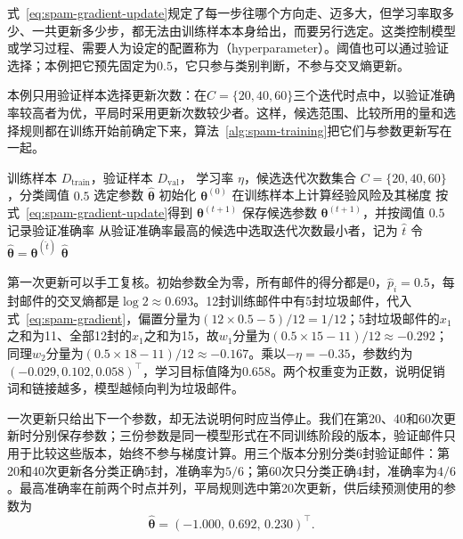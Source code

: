 式~\eqref{eq:spam-gradient-update}规定了每一步往哪个方向走、迈多大，但学习率取多少、一共更新多少步，都无法由训练样本本身给出，而要另行选定。这类控制模型或学习过程、需要人为设定的配置称为（hyperparameter）。阈值也可以通过验证选择；本例把它预先固定为$0.5$，它只参与类别判断，不参与交叉熵更新。

本例只用验证样本选择更新次数：在$C=\{20,40,60\}$三个迭代时点中，以验证准确率较高者为优，平局时采用更新次数较少者。这样，候选范围、比较所用的量和选择规则都在训练开始前确定下来，算法~\ref{alg:spam-training}把它们与参数更新写在一起。

\begin{algorithm}[垃圾邮件分类器的训练]
  \label{alg:spam-training}
  \begin{algorithmic}[1]
    \Require 训练样本 $D_{\mathrm{train}}$，验证样本 $D_{\mathrm{val}}$，
      学习率 $\eta$，候选迭代次数集合 $C=\{20,40,60\}$，分类阈值 $0.5$
    \Ensure 选定参数 $\hat{\bm{\theta}}$
    \State 初始化 $\bm{\theta}^{(0)}$
      \State 在训练样本上计算经验风险及其梯度
      \State 按式~\eqref{eq:spam-gradient-update}得到 $\bm{\theta}^{(t+1)}$
        \State 保存候选参数 $\bm{\theta}^{(t+1)}$，并按阈值 $0.5$ 记录验证准确率
      \EndIf
    \EndFor
    \State 从验证准确率最高的候选中选取迭代次数最小者，记为 $\hat t$
    \State 令 $\hat{\bm{\theta}}=\bm{\theta}^{(\hat t)}$
    \State \Return $\hat{\bm{\theta}}$
  \end{algorithmic}
\end{algorithm}

第一次更新可以手工复核。初始参数全为零，所有邮件的得分都是$0$，$\hat{p}_i=0.5$，每封邮件的交叉熵都是$\log 2\approx0.693$。12封训练邮件中有5封垃圾邮件，代入式~\eqref{eq:spam-gradient}，偏置分量为$(12\times0.5-5)/12=1/12$；5封垃圾邮件的$x_1$之和为11、全部12封的$x_1$之和为15，故$w_1$分量为$(0.5\times15-11)/12\approx-0.292$；同理$w_2$分量为$(0.5\times18-11)/12\approx-0.167$。乘以$-\eta=-0.35$，参数约为$(-0.029,0.102,0.058)^{\top}$，学习目标值降为$0.658$。两个权重变为正数，说明促销词和链接越多，模型越倾向判为垃圾邮件。

一次更新只给出下一个参数，却无法说明何时应当停止。我们在第20、40和60次更新时分别保存参数；三份参数是同一模型形式在不同训练阶段的版本，验证邮件只用于比较这些版本，始终不参与梯度计算。用三个版本分别分类6封验证邮件：第20和40次更新各分类正确5封，准确率为$5/6$；第60次只分类正确4封，准确率为$4/6$。最高准确率在前两个时点并列，平局规则选中第20次更新，供后续预测使用的参数为
\begin{equation}
  \hat{\bm{\theta}}=(-1.000,\,0.692,\,0.230)^{\top}.
  \label{eq:spam-fitted-parameters}
\end{equation}

